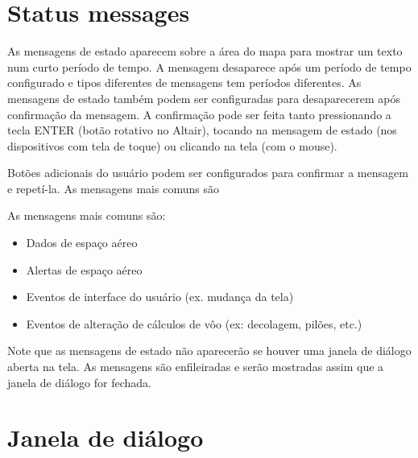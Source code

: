 \section{Status messages}

As mensagens de estado aparecem sobre a área do mapa para mostrar um texto num curto período de tempo.  A mensagem desaparece após um período de tempo configurado e tipos diferentes de mensagens tem períodos diferentes.  As mensagens de estado também podem ser configuradas para desaparecerem após confirmação da mensagem.  A confirmação pode ser feita tanto pressionando a tecla ENTER (botão rotativo no Altair), tocando na mensagem de estado (nos dispositivos com tela de toque) ou clicando na tela (com o mouse).

Botões adicionais do usuário podem ser configurados para confirmar a mensagem e repetí-la.
As mensagens mais comuns são


As mensagens mais comuns são:
\begin{itemize}
\item Dados de espaço aéreo
\item Alertas de espaço aéreo
\item Eventos de interface do usuário (ex. mudança da tela)
\item Eventos de alteração de cálculos de vôo (ex: decolagem, pilões, etc.)
\end{itemize}

Note que as mensagens de estado não aparecerão se houver uma janela de diálogo aberta na tela.  As mensagens são enfileiradas e serão mostradas assim que a janela de diálogo for fechada.  


\section{Janela de diálogo}\label{sec:dialog-windows}

